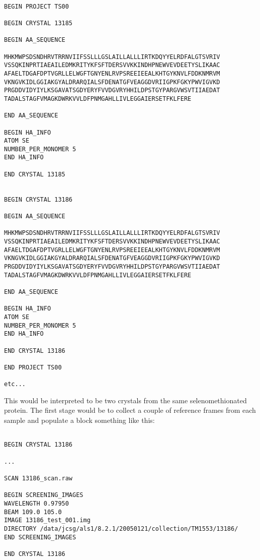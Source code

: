 \documentclass[a4paper, 11pt]{article}
\begin{document}
\begin{verbatim}

BEGIN PROJECT TS00

BEGIN CRYSTAL 13185

BEGIN AA_SEQUENCE

MHKMWPSDSNDHRVTRRNVIIFSSLLLGSLAILLALLLIRTKDQYYELRDFALGTSVRIV
VSSQKINPRTIAEAILEDMKRITYKFSFTDERSVVKKINDHPNEWVEVDEETYSLIKAAC
AFAELTDGAFDPTVGRLLELWGFTGNYENLRVPSREEIEEALKHTGYKNVLFDDKNMRVM
VKNGVKIDLGGIAKGYALDRARQIALSFDENATGFVEAGGDVRIIGPKFGKYPWVIGVKD
PRGDDVIDYIYLKSGAVATSGDYERYFVVDGVRYHHILDPSTGYPARGVWSVTIIAEDAT
TADALSTAGFVMAGKDWRKVVLDFPNMGAHLLIVLEGGAIERSETFKLFERE

END AA_SEQUENCE

BEGIN HA_INFO
ATOM SE
NUMBER_PER_MONOMER 5
END HA_INFO

END CRYSTAL 13185


BEGIN CRYSTAL 13186

BEGIN AA_SEQUENCE

MHKMWPSDSNDHRVTRRNVIIFSSLLLGSLAILLALLLIRTKDQYYELRDFALGTSVRIV
VSSQKINPRTIAEAILEDMKRITYKFSFTDERSVVKKINDHPNEWVEVDEETYSLIKAAC
AFAELTDGAFDPTVGRLLELWGFTGNYENLRVPSREEIEEALKHTGYKNVLFDDKNMRVM
VKNGVKIDLGGIAKGYALDRARQIALSFDENATGFVEAGGDVRIIGPKFGKYPWVIGVKD
PRGDDVIDYIYLKSGAVATSGDYERYFVVDGVRYHHILDPSTGYPARGVWSVTIIAEDAT
TADALSTAGFVMAGKDWRKVVLDFPNMGAHLLIVLEGGAIERSETFKLFERE

END AA_SEQUENCE

BEGIN HA_INFO
ATOM SE
NUMBER_PER_MONOMER 5
END HA_INFO

END CRYSTAL 13186

END PROJECT TS00

etc...

\end{verbatim}

This would be interpreted to be two crystals from the same selenomethionated
protein. The first stage would be to collect a couple of reference frames
from each sample and populate a block something like this:

\begin{verbatim}

BEGIN CRYSTAL 13186

...

SCAN 13186_scan.raw

BEGIN SCREENING_IMAGES
WAVELENGTH 0.97950
BEAM 109.0 105.0
IMAGE 13186_test_001.img
DIRECTORY /data/jcsg/als1/8.2.1/20050121/collection/TM1553/13186/
END SCREENING_IMAGES

END CRYSTAL 13186

\end{verbatim}
\end{document}
